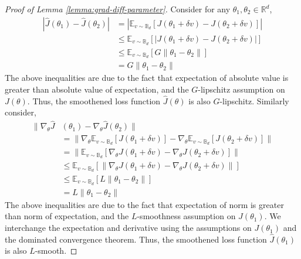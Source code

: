 \begin{proof}[Proof of Lemma \ref{lemma:grad-diff-parameter}]
  Consider for any $\theta_1, \theta_2 \in \mathbb{R}^d$,
\begin{align*}
    |\hat{J}(\theta_1) - \hat{J}(\theta_2)| &= |\mathbb{E}_{v \sim \mathbb{B}_d}[J(\theta_1+\delta v) - J(\theta_2 + \delta v)]| \nonumber \\
    &\leq \mathbb{E}_{v \sim \mathbb{B}_d}[|J(\theta_1+\delta v) - J(\theta_2 + \delta v)|] \nonumber \\
    &\leq \mathbb{E}_{v \sim \mathbb{B}_d}[G\|\theta_1 - \theta_2\|] \nonumber \\
    &= G\|\theta_1 - \theta_2\|
\end{align*}
The above inequalities are due to the fact that expectation of absolute value is greater than absolute value of expectation, and the $G$-lipschitz assumption on $J(\theta)$. Thus, the smoothened loss function $\hat{J}(\theta)$ is also $G$-lipschitz. Similarly consider,
\begin{align*}
  \|\nabla_\theta\hat{J}&(\theta_1) - \nabla_\theta\hat{J}(\theta_2)\| \\
  &= \|\nabla_\theta \mathbb{E}_{v \sim \mathbb{B}_d}[J(\theta_1 + \delta v)] - \nabla_\theta \mathbb{E}_{v \sim \mathbb{B}_d}[J(\theta_2+\delta v)]\| \nonumber \\
    &= \|\mathbb{E}_{v \sim \mathbb{B}_d}[\nabla_\theta J(\theta_1+\delta v)
      - \nabla_\theta J(\theta_2 + \delta v)]\| \nonumber \\
    &\leq \mathbb{E}_{v \sim \mathbb{B}_d}[\|\nabla_\theta J(\theta_1+\delta
      v) - \nabla_\theta J(\theta_2 + \delta v)\|] \nonumber \\
    &\leq \mathbb{E}_{v \sim \mathbb{B}_d}[L\|\theta_1 - \theta_2\|] \nonumber \\
    &= L\|\theta_1 - \theta_2\|
\end{align*}
The above inequalities are due to the fact that expectation of norm is
greater than norm of expectation, and the $L$-smoothness assumption on
$J(\theta_1)$. We interchange the expectation and derivative using the
assumptions on $J(\theta_1)$ and the dominated convergence
theorem. Thus, the smoothened loss function $\hat{J}(\theta_1)$ is
also $L$-smooth.



\end{proof}
